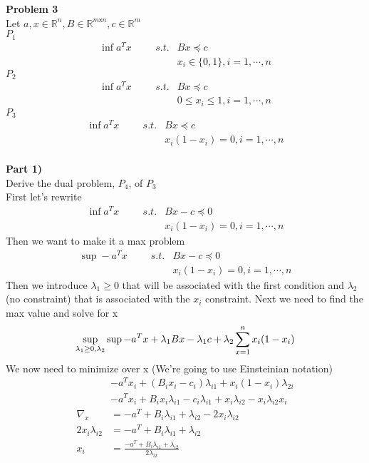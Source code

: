 \documentclass[12pt,letter]{article}
\newcommand{\problem}[1]{\vspace{3mm}\Large\textbf{{Problem {#1}\vspace{3mm}}}\normalsize\\}
\newcommand{\ppart}[1]{\vspace{2mm}\large\textbf{\\Part {#1})\vspace{2mm}}\normalsize\\}
\begin{document}
\problem{3}
Let $a,x\in\mathbb{R}^n, B\in\mathbb{R}^{m\textsf{x}n}, c\in\mathbb{R}^m$
\\
$P_1$
\begin{align*}
    \inf a^T x \hspace{1cm}
    s.t. & Bx \preceq c \\
         & x_i\in\{0,1\},i=1,\cdots,n
\end{align*}
$P_2$
\begin{align*}
    \inf a^T x \hspace{1cm}
    s.t. & Bx \preceq c \\
         & 0 \leq x_i \leq 1,i=1,\cdots,n
\end{align*}
$P_3$
\begin{align*}
    \inf a^T x \hspace{1cm}
    s.t. & Bx \preceq c \\
         & x_i(1-x_i) = 0,i=1,\cdots,n
\end{align*}
\ppart{1}
Derive the dual problem, $P_4$, of $P_3$
\\
First let's rewrite
\begin{align*}
    \inf a^T x \hspace{1cm}
    s.t. & Bx -c \preceq 0 \\
         & x_i(1-x_i) = 0,i=1,\cdots,n
\end{align*}
Then we want to make it a max problem
\begin{align*}
    \sup -a^T x \hspace{1cm}
    s.t. & Bx -c \preceq 0 \\
         & x_i(1-x_i) = 0,i=1,\cdots,n
\end{align*}
Then we introduce $\lambda_1\geq0$ that will be associated with the first condition
and $\lambda_2$ (no constraint) that is associated with the $x_i$ constraint. 
Next we need to find the max value and solve for x
\[
    \sup\limits_{\lambda_1\geq 0,\lambda_2}\sup -a^Tx + \lambda_1Bx - \lambda_1c
    + \lambda_2\sum\limits_{x=1}^nx_i(1-x_i) \\
\]
We now need to minimize over x (We're going to use Einsteinian notation)
\begin{align*}
    &-a^Tx_i + (B_ix_i - c_i)\lambda_{i1} + x_i(1-x_i)\lambda_{2i} \\
    &-a^Tx_i + B_ix_i\lambda_{i1} - c_i\lambda_{i1} + x_i\lambda_{i2} - x_i\lambda_{i2}x_i \\
    \nabla_x &= -a^T + B_i\lambda_{i1} + \lambda_{i2} - 2x_i\lambda_{i2} \\
    2x_i\lambda_{i2} &= -a^T +B_i\lambda_{i1} + \lambda_{i2} \\
    x_i &= \frac{-a^T +B_i\lambda_{i1} + \lambda_{i2}}{2\lambda_{i2}}
\end{align*}
\end{document}
